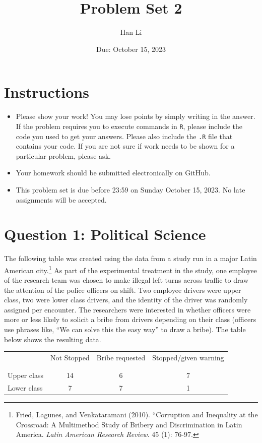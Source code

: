 \documentclass[12pt,letterpaper]{article}
\title{Problem Set 2}
\date{Due: October 15, 2023}
\author{Han Li}
\begin{document}
	\maketitle
	\section*{Instructions}
\begin{itemize}
	\item Please show your work! You may lose points by simply writing in the answer. If the problem requires you to execute commands in \texttt{R}, please include the code you used to get your answers. Please also include the \texttt{.R} file that contains your code. If you are not sure if work needs to be shown for a particular problem, please ask.
	\item Your homework should be submitted electronically on GitHub.
	\item This problem set is due before 23:59 on Sunday October 15, 2023. No late assignments will be accepted.

\end{itemize}

	
	\vspace{.5cm}
	\section*{Question 1: Political Science}
		\vspace{.25cm}
	The following table was created using the data from a study run in a major Latin American city.\footnote{Fried, Lagunes, and Venkataramani (2010). ``Corruption and Inequality at the Crossroad: A Multimethod Study of Bribery and Discrimination in Latin America. \textit{Latin American Research Review}. 45 (1): 76-97.} As part of the experimental treatment in the study, one employee of the research team was chosen to make illegal left turns across traffic to draw the attention of the police officers on shift. Two employee drivers were upper class, two were lower class drivers, and the identity of the driver was randomly assigned per encounter. The researchers were interested in whether officers were more or less likely to solicit a bribe from drivers depending on their class (officers use phrases like, ``We can solve this the easy way'' to draw a bribe). The table below shows the resulting data.

\newpage
\begin{table}[h!]
	\centering
	\begin{tabular}{l | c c c }
		& Not Stopped & Bribe requested & Stopped/given warning \\
		\\[-1.8ex] 
		\hline \\[-1.8ex]
		Upper class & 14 & 6 & 7 \\
		Lower class & 7 & 7 & 1 \\
		\hline
	\end{tabular}
\end{table}
\end{document}
